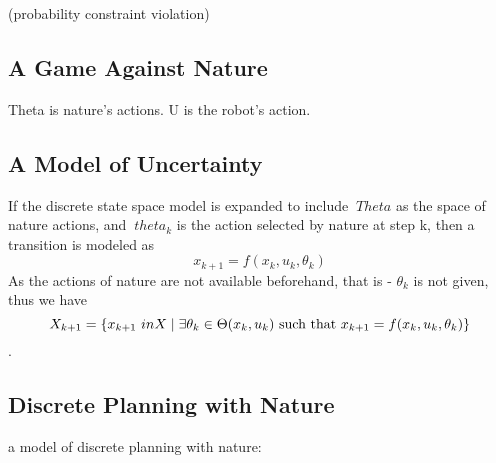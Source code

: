 (probability constraint violation)

\subsection{A Game Against Nature}

Theta is nature's actions. U is the robot's action.

\subsection{A Model of Uncertainty}

If the discrete state space model is expanded to include \(\ Theta\) as the
space of nature actions, and \(\ theta_k\) is the action selected by nature at
step k, then a transition is modeled as
\[
  x_{k+1} = f(x_k,u_k,\theta_k)
\]
As the actions of nature are not available beforehand, that is - \(\theta_ k\)
is not given, thus we have
\[
  X_{k+1} = \lbrace x_{k+1} \ in X \mid \exists\theta_k \in \Theta(x_k,u_k) \text{
      such that } x_{k+1} = f(x_k,u_k,\theta_k)\rbrace
\]
\cite{Lav06}.

\subsection{Discrete Planning with Nature}
a model of discrete planning with nature: \cite[pg,496]{Lav06}

